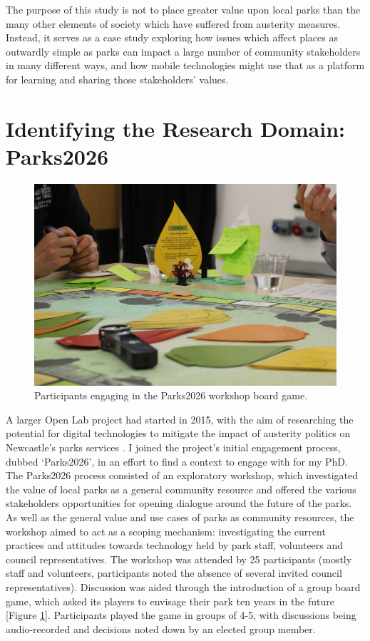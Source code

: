 The purpose of this study is not to place greater value upon local parks than the many other elements of society which have suffered from austerity measures. Instead, it serves as a case study exploring how issues which affect places as outwardly simple as parks can impact a large number of community stakeholders in many different ways, and how mobile technologies might use that as a platform for learning and sharing those stakeholders' values.

\section{Identifying the Research Domain: Parks2026}
\label{sec:Parks2026}

\begin{figure}
  \centering
  \includegraphics[width=0.8\columnwidth]{images/chapter04/parks2026.jpg}
  \caption{Participants engaging in the Parks2026 workshop board game.}
  \label{fig:parks2026}
\end{figure}

A larger Open Lab project had started in 2015, with the aim of researching the potential for digital technologies to mitigate the impact of austerity politics on Newcastle's parks services \citep{Crivellaro2019}. I joined the project's initial engagement process, dubbed `Parks2026', in an effort to find a context to engage with for my PhD. The Parks2026 process consisted of an exploratory workshop, which investigated the value of local parks as a general community resource and offered the various stakeholders opportunities for opening dialogue around the future of the parks. As well as the general value and use cases of parks as community resources, the workshop aimed to act as a scoping mechanism: investigating the current practices and attitudes towards technology held by park staff, volunteers and council representatives. The workshop was attended by 25 participants (mostly staff and volunteers, participants noted the absence of several invited council representatives). Discussion was aided through the introduction of a group board game, which asked its players to envisage their park ten years in the future [Figure \ref{fig:parks2026}]. Participants played the game in groups of 4-5, with discussions being audio-recorded and decisions noted down by an elected group member.

